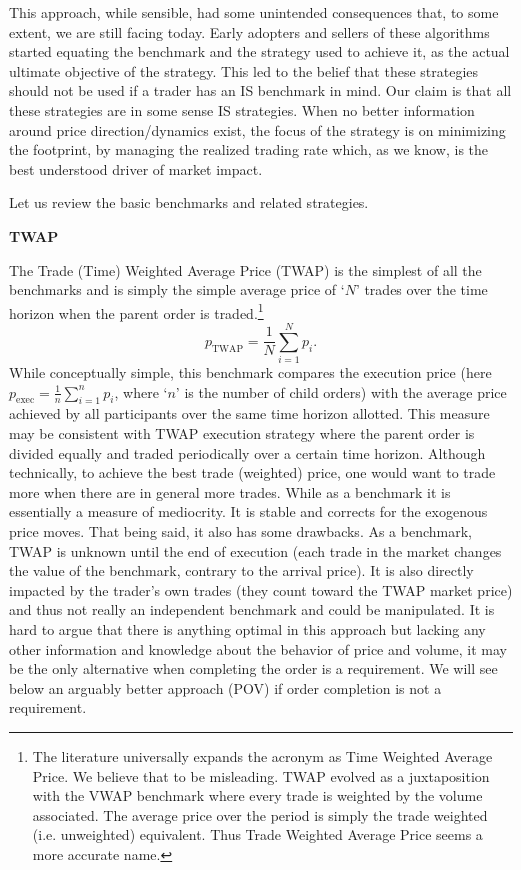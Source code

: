 This approach, while sensible, had some unintended consequences that, to some extent, we are still facing today. Early adopters and sellers of these algorithms started equating the benchmark and the strategy used to achieve it, as the actual ultimate objective of the strategy. This led to the belief that these strategies should not be used if a trader has an IS benchmark in mind. Our claim is that all these strategies are in some sense IS strategies. When no better information around price direction/dynamics exist, the focus of the strategy is on minimizing the footprint, by managing the realized trading rate which, as we know, is the best understood driver of market impact.


Let us review the basic benchmarks and related strategies. \twomedskip


\noindent\textbf{TWAP} \label{in:twap1} \twomedskip

The Trade (Time) Weighted Average Price (TWAP)  is the simplest of all the benchmarks and is simply the simple average price of `$N$' trades over the time horizon when the parent order is traded.\footnote{The literature universally  expands the acronym as Time Weighted Average Price. We believe that to be misleading. TWAP evolved as a juxtaposition with the VWAP benchmark where every trade is weighted by the volume associated. The average price over the period is simply the trade weighted (i.e. unweighted) equivalent. Thus Trade Weighted Average Price seems a more accurate name.}
        \begin{equation} \label{eqn:ptwapeq}
        p_\text{TWAP}= \frac{1}{N} \sum_{i=1}^N {p_i}.
        \end{equation}
While conceptually simple, this benchmark compares the execution price (here $p_\text{exec}= \frac{1}{n} \sum_{i=1}^n p_i$, where `$n$' is the number of child orders) with the average price achieved by all participants over the same time horizon allotted. This measure may be consistent with TWAP execution strategy where the parent order is divided equally and traded periodically over a certain time horizon. Although technically, to achieve the best trade (weighted) price, one would want to trade more when there are in general more trades. While  as a benchmark it is essentially a measure of mediocrity. It is stable and corrects for the exogenous price moves. That being said, it also has some drawbacks. As a benchmark, TWAP is unknown until the end of execution (each trade in the market changes the value of the benchmark, contrary to the arrival price). It is also directly impacted by the trader's own trades (they count toward the TWAP market price) and thus not really an independent benchmark and could be manipulated. It is hard to argue that there is anything optimal in this approach but lacking any other information and knowledge about the behavior of price and volume, it may be the only alternative when completing the order is a requirement. We will see below an arguably better approach (POV) if order completion is not a requirement. 


